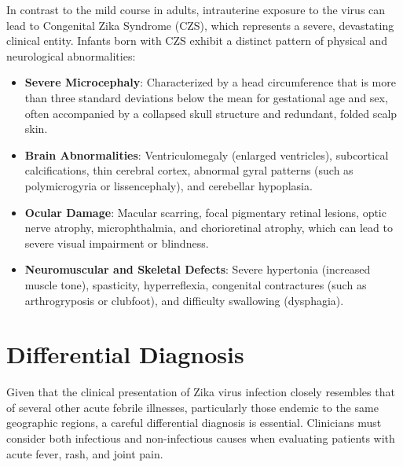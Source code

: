 In contrast to the mild course in adults, intrauterine exposure to the virus can lead to Congenital Zika Syndrome (CZS), which represents a severe, devastating clinical entity. Infants born with CZS exhibit a distinct pattern of physical and neurological abnormalities:
\begin{itemize}
    \item \textbf{Severe Microcephaly}: Characterized by a head circumference that is more than three standard deviations below the mean for gestational age and sex, often accompanied by a collapsed skull structure and redundant, folded scalp skin.
    \item \textbf{Brain Abnormalities}: Ventriculomegaly (enlarged ventricles), subcortical calcifications, thin cerebral cortex, abnormal gyral patterns (such as polymicrogyria or lissencephaly), and cerebellar hypoplasia.
    \item \textbf{Ocular Damage}: Macular scarring, focal pigmentary retinal lesions, optic nerve atrophy, microphthalmia, and chorioretinal atrophy, which can lead to severe visual impairment or blindness.
    \item \textbf{Neuromuscular and Skeletal Defects}: Severe hypertonia (increased muscle tone), spasticity, hyperreflexia, congenital contractures (such as arthrogryposis or clubfoot), and difficulty swallowing (dysphagia).
\end{itemize}

\section*{Differential Diagnosis}
Given that the clinical presentation of Zika virus infection closely resembles that of several other acute febrile illnesses, particularly those endemic to the same geographic regions, a careful differential diagnosis is essential. Clinicians must consider both infectious and non-infectious causes when evaluating patients with acute fever, rash, and joint pain.

